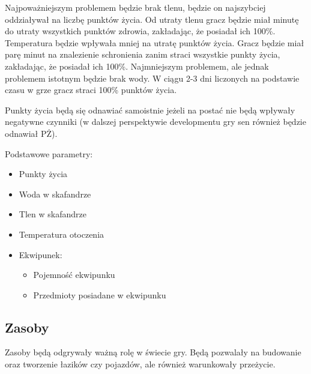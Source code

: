\documentclass[a4paper,12pt]{article}
\begin{document}
Najpoważniejszym problemem będzie brak tlenu, będzie on najszybciej oddziaływał na liczbę punktów życia. Od utraty tlenu gracz będzie miał minutę do utraty wszystkich punktów zdrowia, zakładając, że posiadał ich 100\%.
Temperatura będzie wpływała mniej na utratę punktów życia. Gracz będzie miał parę minut na znalezienie schronienia zanim straci wszystkie punkty życia, zakładając, że posiadał ich 100\%.
Najmniejszym problemem, ale jednak problemem istotnym będzie brak wody. W ciągu 2-3 dni liczonych na podstawie czasu w grze gracz straci 100\% punktów życia.

Punkty życia będą się odnawiać samoistnie jeżeli na postać nie będą wpływały negatywne czynniki (w dalszej perspektywie developmentu gry sen również będzie odnawiał PŻ).

Podstawowe parametry:
\begin{itemize}
	\item Punkty życia
	\item Woda w skafandrze
	\item Tlen w skafandrze
	\item Temperatura otoczenia
	\item Ekwipunek:
	\begin{itemize}
		\item Pojemność ekwipunku
		\item Przedmioty posiadane w ekwipunku
	\end{itemize}
\end{itemize}

\subsection{Zasoby}
Zasoby będą odgrywały ważną rolę w świecie gry. Będą pozwalały na budowanie oraz tworzenie łazików czy pojazdów, ale również warunkowały przeżycie.
\end{document}
